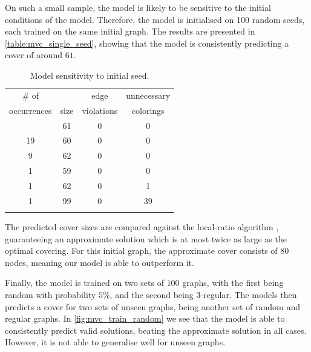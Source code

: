 On such a small sample, the model is likely to be sensitive to the initial conditions of the model.
Therefore, the model is initialised on 100 random seeds, each trained on the same initial graph.
The results are presented in \autoref{table:mvc_single_seed}, showing that the model is consistently predicting a cover of around $61$.

\begin{table}[h!]
\centering
\caption{Model sensitivity to initial seed.}
\begin{tabular}{c|c|c|c}
    \toprule
    \# of & & edge & unnecessary \\
    occurrences & size & violations & colorings \\
    \colrule
    69 & 61 & 0 & 0 \\
    19 & 60 & 0 & 0 \\
    9 & 62 & 0 & 0 \\
    1 & 59 & 0 & 0 \\
    1 & 62 & 0 & 1 \\
    1 & 99 & 0 & 39 \\
    \botrule
\end{tabular}
\label{table:mvc_single_seed}
\end{table}

The predicted cover sizes are compared against the local-ratio algorithm \cite{local_ratio_approx}, guaranteeing an approximate solution which is at most twice as large as the optimal covering.
For this initial graph, the approximate cover consists of $80$ nodes, meaning our model is able to outperform it.

Finally, the model is trained on two sets of $100$ graphs, with the first being random with probability $5\%$, and the second being $3$-regular.
The models then predicts a cover for two sets of unseen graphs, being another set of random and regular graphs.
In \autoref{fig:mvc_train_random} we see that the model is able to consistently predict valid solutions, beating the approximate solution in all cases.
However, it is not able to generalise well for unseen graphs.

